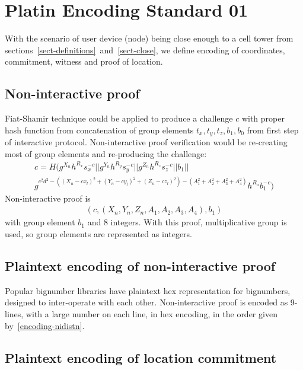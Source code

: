 \documentclass[a4paper,12pt]{article}
\begin{document}
\section{Platin Encoding Standard 01}

With the scenario of user device (node) being close enough to a cell tower
from sections~\ref{sect-definitions}~and~\ref{sect-close},
we define encoding of coordinates, commitment, witness and proof of location.

\subsection{Non-interactive proof}
\label{FS_non_interactive}
Fiat-Shamir technique could be applied to produce a challenge $c$
with proper hash function from concatenation of group elements
$t_x, t_y, t_z, b_1, b_0$ from first step of interactive protocol.
Non-interactive proof verification would be
re-creating most of group elements and
re-producing the challenge:
\begin{multline}
  \label{verf-nidistn}
  c = H(g^{X_n} h^{R_x} s_x^{-c} || g^{Y_n} h^{R_y} s_y^{-c} || g^{Z_n} h^{R_z} s_z^{-c} || b_1 || \\
        g^{c^2 d^2 - ((X_n - c x_l)^2 + (Y_n - c y_l)^2 + (Z_n - c z_l)^2 ) - (A_1^2 + A_2^2 + A_3^2 + A_4^2)} h^{R_a} b_1^{-c})
\end{multline}
Non-interactive proof is
\begin{gather}
\label{encoding-nidistn}
  (c, (X_n, Y_n, Z_n, A_1, A_2, A_3, A_4), b_1)
\end{gather}
with group element $b_1$ and 8 integers.
With this proof, multiplicative group is used, so group elements are represented as integers.

\subsection{Plaintext encoding of non-interactive proof}

Popular bignumber libraries have plaintext hex representation for bignumbers,
designed to inter-operate with each other.
Non-interactive proof is encoded as 9-lines,
with a large number on each line, in hex encoding,
in the order given by~\eqref{encoding-nidistn}.

\subsection{Plaintext encoding of location commitment}
\end{document}

